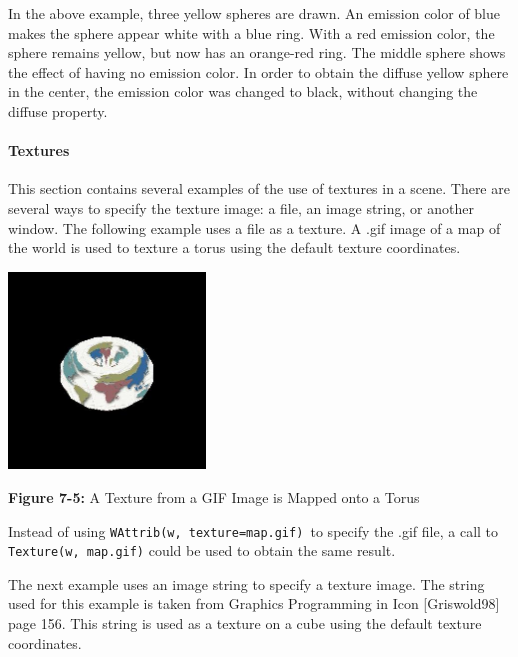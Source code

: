 In the above example, three yellow spheres are drawn. An emission
color of blue makes the sphere appear white with a
blue ring. With a red emission color, the sphere remains yellow, but
now has an orange-red ring. The middle sphere shows the effect of
having no emission color. In order to obtain the diffuse yellow sphere
in the center, the emission color was changed to black, without
changing the diffuse property.

\paragraph{Textures}
This section contains several examples of the use of textures in a
scene. There are several ways to specify the texture image: a file, an
image string, or another window. The following example
uses a file as a texture. A .gif image of a map of the world is used
to texture a torus using the default texture coordinates.

\clearpage

{\centering 
\includegraphics[width=2.0583in,height=2.0583in]{ub-img/ub-img35.jpg}
\par}

{\sffamily\bfseries Figure 7-5:}
{\sffamily A Texture from a GIF Image is Mapped onto a Torus}

\bigskip


Instead of using \texttt{WAttrib(w,
{\textquotedbl}texture=map.gif{\textquotedbl})}\texttt{ }to specify the
.gif file, a call to \texttt{Texture(w,
{\textquotedbl}map.gif{\textquotedbl})} could be used to obtain the
same result.

The next example uses an image string to specify a
texture image. The string used for this example is taken from Graphics
Programming in Icon [Griswold98] page 156. This string is used as a
texture on a cube using the default texture coordinates. 

